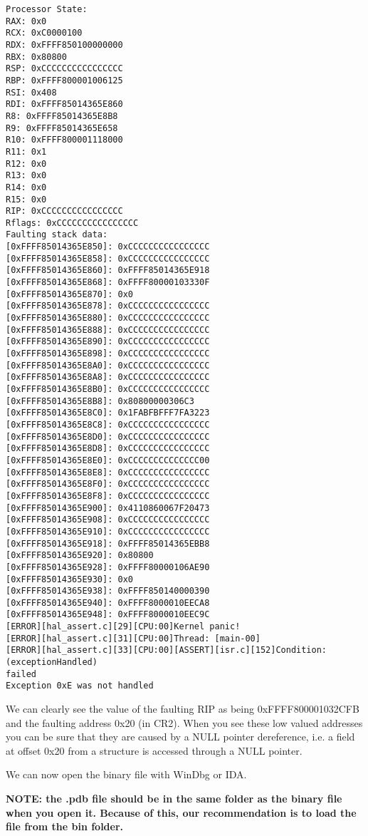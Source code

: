 \begin{appendices}
\begin{verbatim}
Processor State:
RAX: 0x0
RCX: 0xC0000100
RDX: 0xFFFF850100000000
RBX: 0x80800
RSP: 0xCCCCCCCCCCCCCCCC
RBP: 0xFFFF800001006125
RSI: 0x408
RDI: 0xFFFF85014365E860
R8: 0xFFFF85014365E8B8
R9: 0xFFFF85014365E658
R10: 0xFFFF800001118000
R11: 0x1
R12: 0x0
R13: 0x0
R14: 0x0
R15: 0x0
RIP: 0xCCCCCCCCCCCCCCCC
Rflags: 0xCCCCCCCCCCCCCCCC
Faulting stack data:
[0xFFFF85014365E850]: 0xCCCCCCCCCCCCCCCC
[0xFFFF85014365E858]: 0xCCCCCCCCCCCCCCCC
[0xFFFF85014365E860]: 0xFFFF85014365E918
[0xFFFF85014365E868]: 0xFFFF80000103330F
[0xFFFF85014365E870]: 0x0
[0xFFFF85014365E878]: 0xCCCCCCCCCCCCCCCC
[0xFFFF85014365E880]: 0xCCCCCCCCCCCCCCCC
[0xFFFF85014365E888]: 0xCCCCCCCCCCCCCCCC
[0xFFFF85014365E890]: 0xCCCCCCCCCCCCCCCC
[0xFFFF85014365E898]: 0xCCCCCCCCCCCCCCCC
[0xFFFF85014365E8A0]: 0xCCCCCCCCCCCCCCCC
[0xFFFF85014365E8A8]: 0xCCCCCCCCCCCCCCCC
[0xFFFF85014365E8B0]: 0xCCCCCCCCCCCCCCCC
[0xFFFF85014365E8B8]: 0x80800000306C3
[0xFFFF85014365E8C0]: 0x1FABFBFFF7FA3223
[0xFFFF85014365E8C8]: 0xCCCCCCCCCCCCCCCC
[0xFFFF85014365E8D0]: 0xCCCCCCCCCCCCCCCC
[0xFFFF85014365E8D8]: 0xCCCCCCCCCCCCCCCC
[0xFFFF85014365E8E0]: 0xCCCCCCCCCCCCCC00
[0xFFFF85014365E8E8]: 0xCCCCCCCCCCCCCCCC
[0xFFFF85014365E8F0]: 0xCCCCCCCCCCCCCCCC
[0xFFFF85014365E8F8]: 0xCCCCCCCCCCCCCCCC
[0xFFFF85014365E900]: 0x4110860067F20473
[0xFFFF85014365E908]: 0xCCCCCCCCCCCCCCCC
[0xFFFF85014365E910]: 0xCCCCCCCCCCCCCCCC
[0xFFFF85014365E918]: 0xFFFF85014365EBB8
[0xFFFF85014365E920]: 0x80800
[0xFFFF85014365E928]: 0xFFFF80000106AE90
[0xFFFF85014365E930]: 0x0
[0xFFFF85014365E938]: 0xFFFF850140000390
[0xFFFF85014365E940]: 0xFFFF8000010EECA8
[0xFFFF85014365E948]: 0xFFFF8000010EEC9C
[ERROR][hal_assert.c][29][CPU:00]Kernel panic!
[ERROR][hal_assert.c][31][CPU:00]Thread: [main-00]
[ERROR][hal_assert.c][33][CPU:00][ASSERT][isr.c][152]Condition: (exceptionHandled)
failed
Exception 0xE was not handled
\end{verbatim}

We can clearly see the value of the faulting RIP as being 0xFFFF800001032CFB and the faulting address
0x20 (in CR2). When you see these low valued addresses you can be sure that they are caused by a
NULL pointer dereference, i.e. a field at offset 0x20 from a structure is accessed through a NULL
pointer.

We can now open the binary file with WinDbg or IDA.

\textbf{NOTE: the .pdb file should be in the same folder as the binary file when you open it. 
Because of this, our recommendation is to load the  file from the bin folder.}


\end{appendices}
